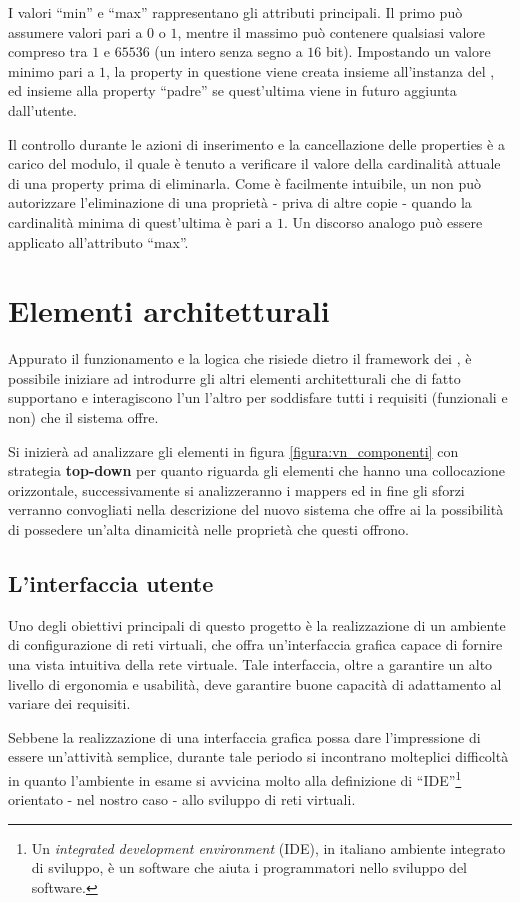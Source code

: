 I valori ``min'' e ``max'' rappresentano gli attributi principali. Il primo può assumere valori pari a $0$ o $1$, mentre il massimo può contenere qualsiasi valore compreso tra $1$ e $65536$ (un intero senza segno a $16$ bit). Impostando un valore minimo pari a $1$, la property in questione viene creata insieme all'instanza del \plugin{}, ed insieme alla property ``padre'' se quest'ultima viene in futuro aggiunta dall'utente.

Il controllo durante le azioni di inserimento e la cancellazione delle properties è a carico del modulo, il quale è tenuto a verificare il valore della cardinalità attuale di una property prima di eliminarla. Come è facilmente intuibile, un \plugin{} non può autorizzare l'eliminazione di una proprietà - priva di altre copie - quando la cardinalità minima di quest'ultima è pari a $1$. Un discorso analogo può essere applicato all'attributo ``max''.

\section{Elementi architetturali}
Appurato il funzionamento e la logica che risiede dietro il framework dei \plugin{}, è possibile iniziare ad introdurre gli altri elementi architetturali che di fatto supportano e interagiscono l'un l'altro per soddisfare tutti i requisiti (funzionali e non) che il sistema offre.

Si inizierà ad analizzare gli elementi in figura \ref{figura:vn_componenti} con strategia \textbf{top-down} per quanto riguarda gli elementi che hanno una collocazione orizzontale, successivamente si analizzeranno i mappers ed in fine gli sforzi verranno convogliati nella descrizione del nuovo sistema che offre ai \plugin{} la possibilità di possedere un'alta dinamicità nelle proprietà che questi offrono.

\subsection{L'interfaccia utente}
Uno degli obiettivi principali di questo progetto è la realizzazione di un ambiente di configurazione di reti virtuali, che offra un'interfaccia grafica capace di fornire una vista intuitiva della rete virtuale.
Tale interfaccia, oltre a garantire un alto livello di ergonomia e usabilità, deve garantire buone capacità di adattamento al variare dei requisiti.

Sebbene la realizzazione di una interfaccia grafica possa dare l'impressione di essere un'attività semplice, durante tale periodo si incontrano molteplici difficoltà in quanto l'ambiente in esame si avvicina molto alla definizione di ``IDE''\footnote{Un \textit{integrated development environment} (IDE), in italiano ambiente integrato di sviluppo, è un software che aiuta i programmatori nello sviluppo del software.} orientato - nel nostro caso - allo sviluppo di reti virtuali.


